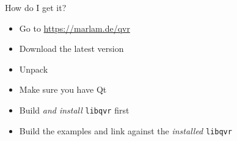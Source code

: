 \documentclass[utf8,stillsansserifmath,fleqn,t]{beamer}
\begin{document}
\begin{frame}
\frametitle{\insertsection}
How do I get it?
\begin{itemize}
\item Go to \href{https://marlam.de/qvr}{https://marlam.de/qvr}
\item Download the latest version
\item Unpack
\item Make sure you have Qt
\item Build \emph{and install} \texttt{libqvr} first
\item Build the examples and link against the \emph{installed} \texttt{libqvr}
\end{itemize}
\end{frame}
\end{document}

